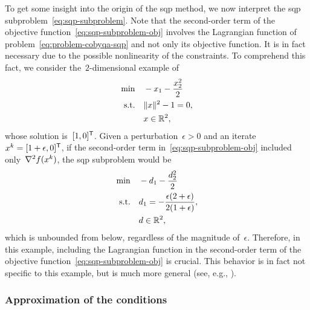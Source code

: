 To get some insight into the origin of the \gls{sqp} method, we now interpret the \gls{sqp} subproblem~\cref{eq:sqp-subproblem}.
Note that the second-order term of the objective function~\cref{eq:sqp-subproblem-obj} involves the Lagrangian function of problem~\cref{eq:problem-cobyqa-sqp} and not only its objective function.
It is in fact necessary due to the possible nonlinearity of the constraints.
To comprehend this fact, we consider the~$2$-dimensional example of \citeauthor{Boggs_Tolle_1995}~\cite{Boggs_Tolle_1995}
\begin{align*}
    \min        & \quad -x_1 - \frac{x_2^2}{2}\\
    \text{s.t.} & \quad \norm{x}^2 - 1 = 0,\\
                & \quad \iter \in \R^2,
\end{align*}
whose solution is~$[1, 0]^{\mathsf{T}}$.
Given a perturbation~$\epsilon > 0$ and an iterate~$\iter[k] = [1 + \epsilon, 0]^{\T}$, if the second-order term in~\cref{eq:sqp-subproblem-obj} included only~$\nabla^2 \obj(\iter[k])$, the \gls{sqp} subproblem would be
\begin{align*}
    \min        & \quad -\step_1 - \frac{\step_2^2}{2}\\
    \text{s.t.} & \quad \step_1 = -\frac{\epsilon (2 + \epsilon)}{2 (1 + \epsilon)},\\
                & \quad \step \in \R^2,
\end{align*}
which is unbounded from below, regardless of the magnitude of~$\epsilon$.
Therefore, in this example, including the Lagrangian function in the second-order term of the objective function~\cref{eq:sqp-subproblem-obj} is crucial.
This behavior is in fact not specific to this example, but is much more general (see, e.g., \cite[ch.~18]{Nocedal_Wright_2006}).

\subsubsection{Approximation of the  conditions}

